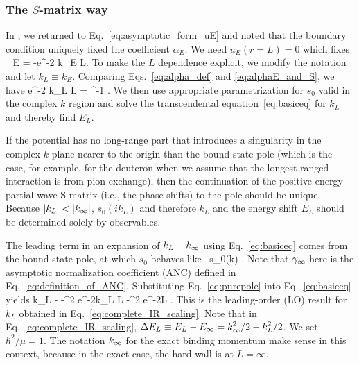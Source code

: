 	\subsubsection{The $S$-matrix way}

	In \cite{Furnstahl:2013vda}, we returned to Eq.~\eqref{eq:asymptotic_form_uE}
	and noted that the boundary condition uniquely fixed the coefficient
	$\alpha_E$.  We need $u_E(r = L) = 0$ which fixes
	\beq
	\alpha_E = -e^{-2 k_E L}\;.
	\label{eq:alpha_def}
	\eeq
	To make the $L$ dependence explicit, we modify the notation and let
	$k_L \equiv k_E$.  Comparing Eqs.~\eqref{eq:alpha_def} and
	\eqref{eq:alphaE_and_S}, we have
	\beq
	e^{-2 k_L L} = \left[s_0(i k_L)\right]^{-1} \;.
	\label{eq:basiceq}
	\eeq
	We then use appropriate parametrization for $s_0$ valid in the complex $k$
	region and solve the transcendental
	equation~\eqref{eq:basiceq} for $k_L$ and thereby find $E_L$.

	If the potential has no long-range part that introduces a singularity
	in the complex $k$ plane nearer to the origin than the bound-state
	pole (which is the case, for example, for the deuteron when we assume that
	the longest-ranged interaction is from pion exchange), then the
	continuation of the positive-energy partial-wave S-matrix (i.e., the
	phase shifts) to the pole should be unique.  Because $|k_L| <
	|k_{\infty}|$, $s_0(i k_L)$ and therefore $k_L$ and the energy shift $E_L$
	should be determined solely by observables.

	The leading term in an expansion of $k_L - k_{\infty}$ using
	Eq.~\eqref{eq:basiceq} comes from the bound-state pole, at which $s_0$
	behaves like~\cite{newton2002scattering}
	\beq
	  s_0(k) \approx {}
	  \;.
	  \label{eq:purepole}
	\eeq
	Note that $\gamma_\infty$ here is
	the asymptotic normalization coefficient (ANC) defined in
	Eq.~\eqref{eq:definition_of_ANC}.
	Substituting Eq.~\eqref{eq:purepole} into Eq.~\eqref{eq:basiceq} yields
	\beq
	  k_L - \kinf \approx -\ANC^2 e^{-2k_L L} \approx -\ANC^2 e^{-2\kinf L}
	  \;.
	  \label{eq:kLatLO}
	\eeq
	This is the leading-order (LO) result for $k_L$ obtained in
	Eq.~\eqref{eq:complete_IR_scaling}.  Note that in
	Eq.~\eqref{eq:complete_IR_scaling}, $\displaystyle \Delta E_L \equiv
	E_L - E_{\infty} = k_{\infty}^2/2 - k_L^2/2$.  We set $\displaystyle \hbar^2/ \mu = 1$.
	The notation $k_{\infty}$ for the exact binding momentum make sense in this
	context, because in the exact case, the hard wall is at $L = \infty$.

